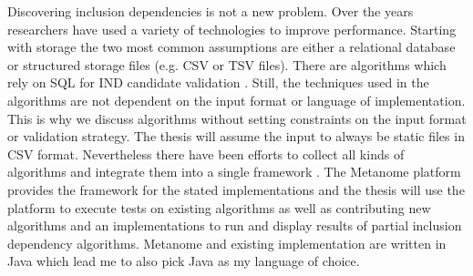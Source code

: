 Discovering inclusion dependencies is not a new problem. Over the years researchers have used a variety of technologies to improve performance. Starting with storage the two most common assumptions are either a relational database or structured storage files (e.g. CSV or TSV files). There are algorithms which rely on SQL for IND candidate validation \cite{bell1995discovery}
. Still, the techniques used in the algorithms are not dependent on the input format or language of implementation. This is why we discuss algorithms without setting constraints on the input format or validation strategy. The thesis will assume the input to always be static files in CSV format. Nevertheless there have been efforts to collect all kinds of algorithms and integrate them into a single framework \cite{dursch2019inclusion}. The Metanome platform \cite{Papenbrock:2015:DPM:2824032.2824086} provides the framework for the stated implementations and the thesis will use the platform to execute tests on existing algorithms as well as contributing new algorithms and an implementations to run and display results of partial inclusion dependency algorithms. Metanome and existing implementation are written in Java which lead me to also pick Java as my language of choice.